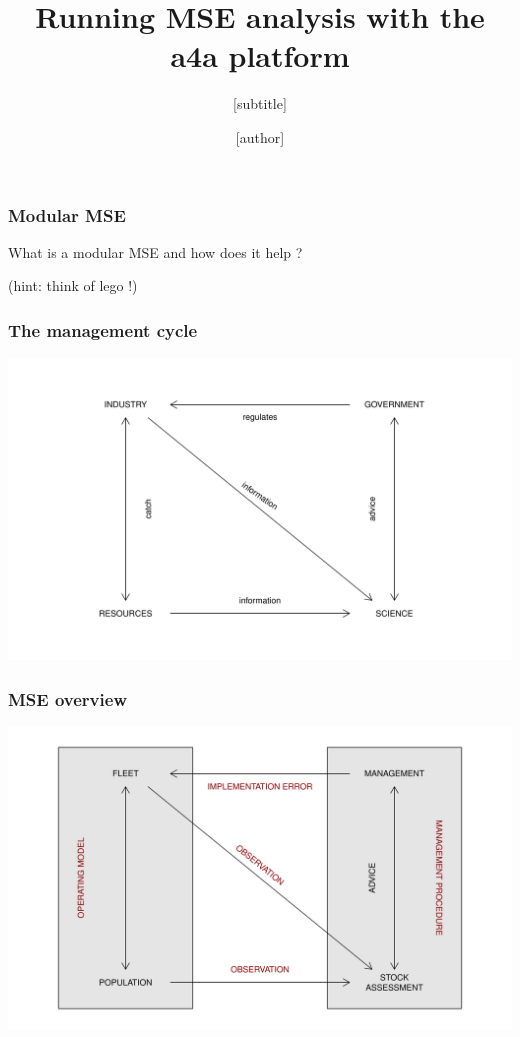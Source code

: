 \documentclass{beamer}
\title{Running MSE analysis with the a4a platform}
\subtitle{[subtitle]}
\author{[author] \\ \normalfont {\scriptsize \href{mailto:jdoe@doe.com}{<[email]>}}}
\institute{[affiliation]}
\begin{document}
\begin{frame}
\titlepage

\end{frame}

\begin{frame}
\frametitle{Modular MSE}

\Large \centering What is a modular MSE and how does it help ?

\vspace{1cm}

(hint: think of lego !) 

\end{frame}

\begin{frame}
\frametitle{The management cycle}

\centering
\includegraphics[height=0.8\textheight]{managementCycle2}

\end{frame}

\begin{frame}
\frametitle{MSE overview}
	
\begin{center}
\includegraphics[height=0.8\textheight]{mse}
\end{center}
	
\end{frame}
\end{document}
